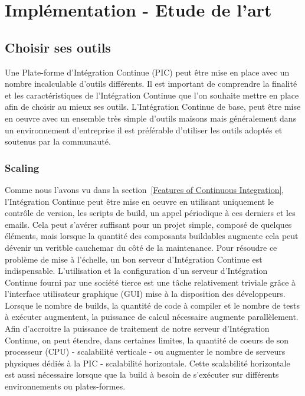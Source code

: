 \chapter{Implémentation - Etude de l'art}

  \section{Choisir ses outils}
  Une Plate-forme d'Intégration Continue (PIC) peut être mise en place avec un nombre incalculable d'outils différents. Il est important de comprendre la finalité et les caractéristiques de l'Intégration Continue que l'on souhaite mettre en place afin de choisir au mieux ses outils. L'Intégration Continue de base, peut être mise en oeuvre avec un ensemble très simple d'outils maisons mais généralement dans un environnement d'entreprise il est préférable d'utiliser les outils adoptés et soutenus par la communauté.

    \subsection{Scaling}
    Comme nous l'avons vu dans la section~\ref{Features of Continuous Integration}, l'Intégration Continue peut être mise en oeuvre en utilisant uniquement le contrôle de version, les scripts de build, un appel périodique à ces derniers et les emails. Cela peut s'avérer suffisant pour un projet simple, composé de quelques éléments, mais lorsque la quantité des composants buildables augmente cela peut dévenir un veritble cauchemar du côté de la maintenance. Pour résoudre ce problème de mise à l'échelle, un bon serveur d'Intégration Continue est indispensable. L'utilisation et la configuration d'un serveur d'Intégration Continue fourni par une société tierce est une tâche relativement triviale grâce à l'interface utilisateur graphique (\gls{GUI}) mise à la disposition des développeurs.\\

    Lorsque le nombre de builds, la quantité de code à compiler et le nombre de tests à exécuter augmentent, la puissance de calcul nécessaire augmente parallèlement. Afin d'accroitre la puissance de traitement de notre serveur d'Intégration Continue, on peut étendre, dans certaines limites, la quantité de coeurs de son processeur (CPU) - scalabilité verticale - ou augmenter le nombre de serveurs physiques dédiés à la PIC - scalabilité horizontale. Cette scalabilité horizontale est aussi nécessaire lorsque que la build à besoin de s'exécuter sur différents environnements ou plates-formes.

